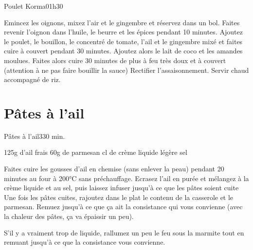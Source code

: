 {\begin{recette}{Poulet Korma}{0}{1h30}{}
\begin{preparation}
\etape Emincez les oignons, mixez l'air et le gingembre et réservez dans un bol.
\etape Faites revenir l'oignon dans l'huile, le beurre et les épices pendant 10 minutes. 
\etape Ajoutez le poulet, le bouillon, le concentré de tomate, l'ail et le gingembre mixé et faites cuire à couvert pendant 30 minutes.
\etape Ajoutez alors le lait de coco et les amandes moulues. Faites alors cuire 30 minutes de plus à feu très doux et à couvert (attention à ne pas faire bouillir la sauce) Rectifier l'assaisonnement.
\etape Servir chaud accompagné de riz.
\end{preparation}
\end{recette}

\section{Pâtes à l'ail}
\begin{recette}{Pâtes à l'ail}{3}{30 min.}{}
\begin{ingredients}
\ingredient 125g d'ail frais
\ingredient 60g de parmesan
 cl de crème liquide légère 
\ingredient sel
\end{ingredients}


\begin{preparation}
\etape Faites cuire les gousses d'ail en chemise (sans enlever la peau) pendant 20 minutes au four à 200°C sans préchauffage. 
\etape Ecrasez l'ail en purée et mélangez à la crème liquide et au sel, puis laissez infuser jusqu'à ce que les pâtes soient cuite
\etape Une fois les pâtes cuites, rajoutez dans le plat le contenu de la casserole et le parmesan. Remuez jusqu'à ce que ça ait la consistance qui vous convienne (avec la chaleur des pâtes, ça va épaissir un peu).
\begin{remarque}
S'il y a vraiment trop de liquide, rallumez un peu le feu sous la marmite tout en remuant jusqu'à ce que la consistance vous convienne.
\end{remarque}
\end{preparation}
\end{recette}


}%

